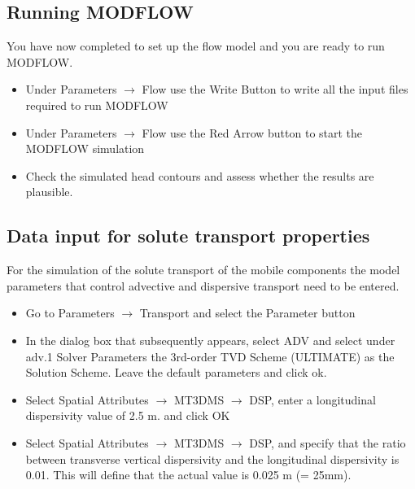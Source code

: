 \subsection{Running MODFLOW}

You have now completed to set up the flow model and you are ready to run MODFLOW.

\begin{itemize}

\item Under {\color{blue}Parameters} $\rightarrow$ {\color{blue}Flow} use the {\color{blue}Write Button} to write all the input files required to run MODFLOW

\item Under {\color{blue}Parameters} $\rightarrow$ {\color{blue}Flow} use the 
{\color{blue}Red Arrow} button to start the MODFLOW simulation

\item Check the simulated head contours and assess whether the results are plausible.


\end{itemize}


\subsection[Data input for solute transport properties]{Data input for solute transport properties}

For the simulation of the solute transport of the mobile components the model parameters that control advective and dispersive transport need to be entered. 

\begin{itemize}

\item Go to {\color{blue}Parameters} $\rightarrow$ {\color{blue}Transport} and select the {\color{blue}Parameter} button

\item In the dialog box that subsequently appears, select {\color{blue}ADV} and select under {\color{blue}adv.1 Solver Parameters} the {\color{blue}3rd-order TVD Scheme (ULTIMATE)} as the Solution Scheme. Leave the default parameters and click {\color{blue}ok}.

\item Select {\color{blue}Spatial Attributes} $\rightarrow$ {\color{blue}MT3DMS} $\rightarrow$ {\color{blue}DSP}, enter a longitudinal dispersivity value of 2.5 m. and click {\color{blue}OK}

\item Select {\color{blue}Spatial Attributes} $\rightarrow$ {\color{blue}MT3DMS} $\rightarrow$ {\color{blue}DSP}, and specify that the ratio between transverse vertical dispersivity and the longitudinal dispersivity is 0.01.
This will define that the actual value is 0.025 m (= 25mm). 


\end{itemize}

